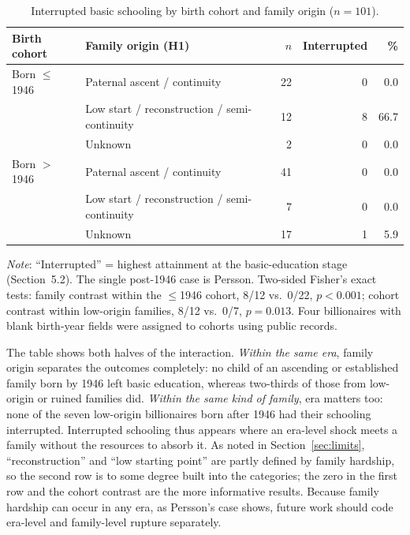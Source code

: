 \documentclass[11pt,a4paper]{article}
\begin{document}
\begin{table}[htbp]
\centering
\caption{Interrupted basic schooling by birth cohort and family origin ($n=101$).}
\label{tab:h2x}
\small
\begin{tabular}{llrrr}
\toprule
Birth cohort & Family origin (H1) & $n$ & Interrupted & \% \\
\midrule
Born $\leq$1946 & Paternal ascent / continuity & 22 & 0 & 0.0 \\
                & Low start / reconstruction / semi-continuity & 12 & 8 & 66.7 \\
                & Unknown & 2 & 0 & 0.0 \\
\midrule
Born $>$1946    & Paternal ascent / continuity & 41 & 0 & 0.0 \\
                & Low start / reconstruction / semi-continuity & 7 & 0 & 0.0 \\
                & Unknown & 17 & 1 & 5.9 \\
\bottomrule
\end{tabular}

\smallskip
\parbox{0.92\linewidth}{\footnotesize\emph{Note}: ``Interrupted'' = highest attainment at the basic-education stage (Section~5.2). The single post-1946 case is Persson. Two-sided Fisher's exact tests: family contrast within the $\leq$1946 cohort, 8/12 vs.\ 0/22, $p<0.001$; cohort contrast within low-origin families, 8/12 vs.\ 0/7, $p=0.013$. Four billionaires with blank birth-year fields were assigned to cohorts using public records.}
\end{table}

The table shows both halves of the interaction. \emph{Within the same era}, family origin separates the outcomes completely: no child of an ascending or established family born by 1946 left basic education, whereas two-thirds of those from low-origin or ruined families did. \emph{Within the same kind of family}, era matters too: none of the seven low-origin billionaires born after 1946 had their schooling interrupted. Interrupted schooling thus appears where an era-level shock meets a family without the resources to absorb it. As noted in Section~\ref{sec:limits}, ``reconstruction'' and ``low starting point'' are partly defined by family hardship, so the second row is to some degree built into the categories; the zero in the first row and the cohort contrast are the more informative results. Because family hardship can occur in any era, as Persson's case shows, future work should code era-level and family-level rupture separately.
\end{document}
